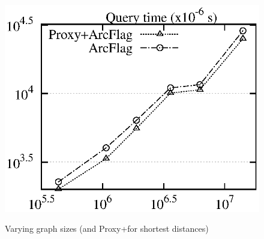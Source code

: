 \begin{figure}[tb!]
\begin{center}
{\includegraphics[scale=0.422]{./exp/query_q7_dist_af.eps}}
\end{center}
\vspace{-0.5ex}
\caption{Varying graph sizes (\arcflag and Proxy+\arcflag  for shortest distances)}
\label{fig:performance_dist_graph_size_af}
\vspace{-1ex}
\end{figure}


